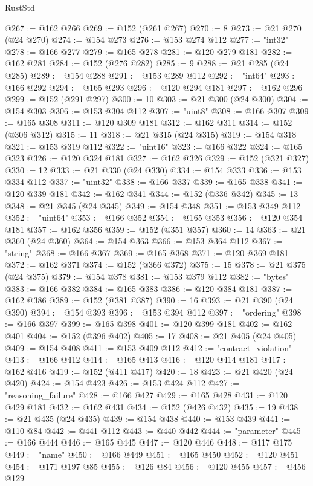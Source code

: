 \begin{lexlean}{RustStd}
\begin{coremodule}
@267 := @162 @266
@269 := @152 (@261 @267)
@270 := 8
@273 := @21 @270 (@24 @270)
@274 := @154 @273
@276 := @153 @274 @112
@277 := "int32"
@278 := @166 @277
@279 := @165 @278
@281 := @120 @279 @181
@282 := @162 @281
@284 := @152 (@276 @282)
@285 := 9
@288 := @21 @285 (@24 @285)
@289 := @154 @288
@291 := @153 @289 @112
@292 := "int64"
@293 := @166 @292
@294 := @165 @293
@296 := @120 @294 @181
@297 := @162 @296
@299 := @152 (@291 @297)
@300 := 10
@303 := @21 @300 (@24 @300)
@304 := @154 @303
@306 := @153 @304 @112
@307 := "uint8"
@308 := @166 @307
@309 := @165 @308
@311 := @120 @309 @181
@312 := @162 @311
@314 := @152 (@306 @312)
@315 := 11
@318 := @21 @315 (@24 @315)
@319 := @154 @318
@321 := @153 @319 @112
@322 := "uint16"
@323 := @166 @322
@324 := @165 @323
@326 := @120 @324 @181
@327 := @162 @326
@329 := @152 (@321 @327)
@330 := 12
@333 := @21 @330 (@24 @330)
@334 := @154 @333
@336 := @153 @334 @112
@337 := "uint32"
@338 := @166 @337
@339 := @165 @338
@341 := @120 @339 @181
@342 := @162 @341
@344 := @152 (@336 @342)
@345 := 13
@348 := @21 @345 (@24 @345)
@349 := @154 @348
@351 := @153 @349 @112
@352 := "uint64"
@353 := @166 @352
@354 := @165 @353
@356 := @120 @354 @181
@357 := @162 @356
@359 := @152 (@351 @357)
@360 := 14
@363 := @21 @360 (@24 @360)
@364 := @154 @363
@366 := @153 @364 @112
@367 := "string"
@368 := @166 @367
@369 := @165 @368
@371 := @120 @369 @181
@372 := @162 @371
@374 := @152 (@366 @372)
@375 := 15
@378 := @21 @375 (@24 @375)
@379 := @154 @378
@381 := @153 @379 @112
@382 := "bytes"
@383 := @166 @382
@384 := @165 @383
@386 := @120 @384 @181
@387 := @162 @386
@389 := @152 (@381 @387)
@390 := 16
@393 := @21 @390 (@24 @390)
@394 := @154 @393
@396 := @153 @394 @112
@397 := "ordering"
@398 := @166 @397
@399 := @165 @398
@401 := @120 @399 @181
@402 := @162 @401
@404 := @152 (@396 @402)
@405 := 17
@408 := @21 @405 (@24 @405)
@409 := @154 @408
@411 := @153 @409 @112
@412 := "contract_violation"
@413 := @166 @412
@414 := @165 @413
@416 := @120 @414 @181
@417 := @162 @416
@419 := @152 (@411 @417)
@420 := 18
@423 := @21 @420 (@24 @420)
@424 := @154 @423
@426 := @153 @424 @112
@427 := "reasoning_failure"
@428 := @166 @427
@429 := @165 @428
@431 := @120 @429 @181
@432 := @162 @431
@434 := @152 (@426 @432)
@435 := 19
@438 := @21 @435 (@24 @435)
@439 := @154 @438
@440 := @153 @439
@441 := @110 @84
@442 := @441 @112
@443 := @440 @442
@444 := "parameter"
@445 := @166 @444
@446 := @165 @445
@447 := @120 @446
@448 := @117 @175
@449 := "name"
@450 := @166 @449
@451 := @165 @450
@452 := @120 @451
@454 := @171 @197 @85
@455 := @126 @84
@456 := @120 @455
@457 := @456 @129

\end{coremodule}
\end{lexlean}
